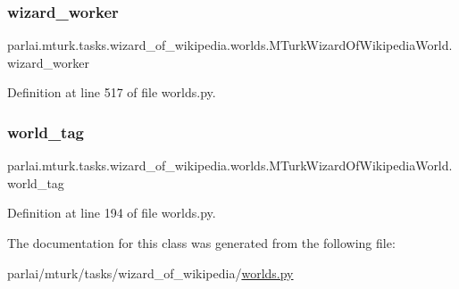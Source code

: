 \subsubsection{\texorpdfstring{wizard\+\_\+worker}{wizard\_worker}}
{\footnotesize\ttfamily parlai.\+mturk.\+tasks.\+wizard\+\_\+of\+\_\+wikipedia.\+worlds.\+M\+Turk\+Wizard\+Of\+Wikipedia\+World.\+wizard\+\_\+worker}



Definition at line 517 of file worlds.\+py.

\mbox{\label{classparlai_1_1mturk_1_1tasks_1_1wizard__of__wikipedia_1_1worlds_1_1MTurkWizardOfWikipediaWorld_ae3c5ecb7dfbcfd5ede55035fa23d3722}} 
\subsubsection{\texorpdfstring{world\+\_\+tag}{world\_tag}}
{\footnotesize\ttfamily parlai.\+mturk.\+tasks.\+wizard\+\_\+of\+\_\+wikipedia.\+worlds.\+M\+Turk\+Wizard\+Of\+Wikipedia\+World.\+world\+\_\+tag}



Definition at line 194 of file worlds.\+py.



The documentation for this class was generated from the following file\+:\begin{DoxyCompactItemize}
\item 
parlai/mturk/tasks/wizard\+\_\+of\+\_\+wikipedia/\hyperlink{parlai_2mturk_2tasks_2wizard__of__wikipedia_2worlds_8py}{worlds.\+py}\end{DoxyCompactItemize}
